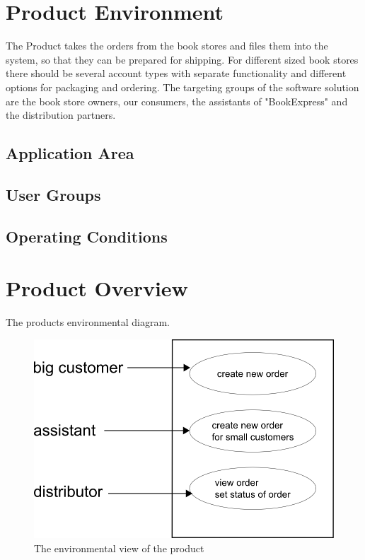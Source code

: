 \documentclass[11pt,a4paper,oneside,svgnames]{report}
\begin{document}
\chapter{Product Environment}
The Product takes the orders from the book stores and files them into the system, so that they can be prepared for shipping. For different sized book stores there should be several account types with separate functionality and different options for packaging and ordering. The targeting groups of the software solution are the book store owners, our consumers, the assistants of "BookExpress" and the distribution partners.
\section{Application Area}
\section{User Groups}
\section{Operating Conditions}

\chapter{Product Overview}
The products environmental diagram.

\begin{figure}[h!]
 \begin{center}
  \includegraphics[scale=0.8]{images/umweltdiagramm.png}
 \end{center}
 \caption{The environmental view of the product}
\end{figure}
\end{document}
